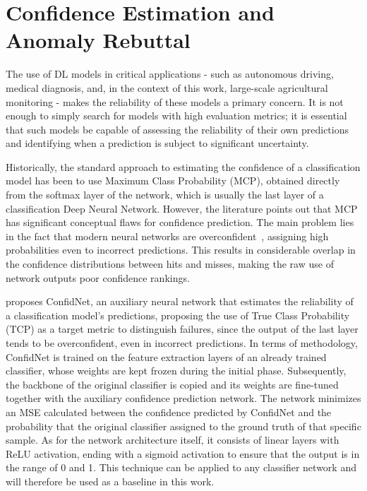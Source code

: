 \section{Confidence Estimation and Anomaly Rebuttal}
\label{sec:conf_contextualization}

The use of \ac{DL} models in critical applications - such as autonomous driving, medical diagnosis, and, in the context of this work, large-scale agricultural monitoring - makes the reliability of these models a primary concern. It is not enough to simply search for models with high evaluation metrics; it is essential that such models be capable of assessing the reliability of their own predictions and identifying when a prediction is subject to significant uncertainty.

Historically, the standard approach to estimating the confidence of a classification model has been to use Maximum Class Probability (MCP), obtained directly from the softmax layer of the network, which is usually the last layer of a classification Deep Neural Network. However, the literature points out that MCP has significant conceptual flaws for confidence prediction. The main problem lies in the fact that modern neural networks are overconfident~\citep{NEURIPS2021_61f3a6db,pmlr-v162-wei22d}, assigning high probabilities even to incorrect predictions. This results in considerable overlap in the confidence distributions between hits and misses, making the raw use of network outputs poor confidence rankings.

\cite{corbiere2019addressing} proposes ConfidNet, an auxiliary neural network that estimates the reliability of a classification model's predictions, proposing the use of True Class Probability (TCP) as a target metric to distinguish failures, since the output of the last layer tends to be overconfident, even in incorrect predictions. In terms of methodology, ConfidNet is trained on the feature extraction layers of an already trained classifier, whose weights are kept frozen during the initial phase. Subsequently, the backbone of the original classifier is copied and its weights are fine-tuned together with the auxiliary confidence prediction network. The network minimizes an MSE calculated between the confidence predicted by ConfidNet and the probability that the original classifier assigned to the ground truth of that specific sample. As for the network architecture itself, it consists of linear layers with ReLU activation, ending with a sigmoid activation to ensure that the output is in the range of 0 and 1. This technique can be applied to any classifier network and will therefore be used as a baseline in this work.


